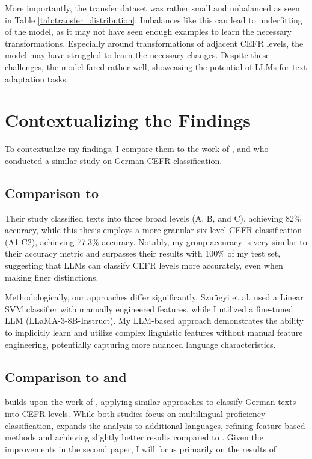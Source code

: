 More importantly, the transfer dataset was rather small and unbalanced as seen in Table \ref{tab:transfer_distribution}. Imbalances like this can lead to underfitting of the model, as it may not have seen enough examples to learn the necessary transformations. Especially around transformations of adjacent CEFR levels, the model may have struggled to learn the necessary changes. Despite these challenges, the model fared rather well, showcasing the potential of LLMs for text adaptation tasks.

\section{Contextualizing the Findings}
\label{s:contextualizing_the_findings}
To contextualize my findings, I compare them to the work of \cite{Szuuegyi2019}, \cite{Vajjala2018} and \cite{Caines2020} who conducted a similar study on German CEFR classification.

\subsection*{Comparison to \cite{Szuuegyi2019}}
\label{ss:comparison_to_szuegyi2019}
Their study classified texts into three broad levels (A, B, and C), achieving 82\% accuracy, while this thesis employs a more granular six-level CEFR classification (A1-C2), achieving 77.3\% accuracy. Notably, my group accuracy is very similar to their accuracy metric and surpasses their results with 100\% of my test set, suggesting that LLMs can classify CEFR levels more accurately, even when making finer distinctions.

Methodologically, our approaches differ significantly. Szuügyi et al. used a Linear SVM classifier with manually engineered features, while I utilized a fine-tuned LLM (LLaMA-3-8B-Instruct). My LLM-based approach demonstrates the ability to implicitly learn and utilize complex linguistic features without manual feature engineering, potentially capturing more nuanced language characteristics.

\subsection*{Comparison to \cite{Vajjala2018} and \cite{Caines2020}}
\label{ss:comparison_to_vajjala2018_and_caines2020}
\cite{Caines2020} builds upon the work of \cite{Vajjala2018}, applying similar approaches to classify German texts into CEFR levels. While both studies focus on multilingual proficiency classification, \cite{Caines2020} expands the analysis to additional languages, refining feature-based methods and achieving slightly better results compared to \cite{Vajjala2018}. Given the improvements in the second paper, I will focus primarily on the results of \cite{Caines2020}.

